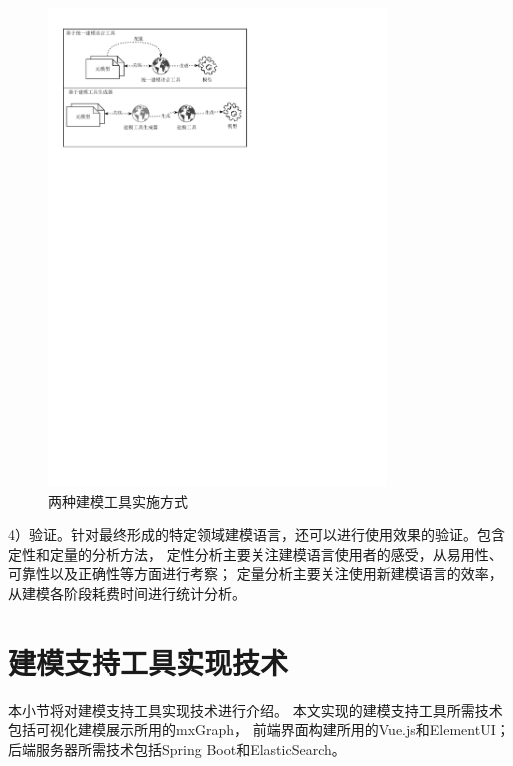 \begin{figure}[!htbp] %
    \centering %
    \includegraphics[width=0.8\textwidth]{FIGs/chapter3/2kindsmodeling.pdf} %
    \caption{两种建模工具实施方式} %
    \label{2kindsmodeling} %
\end{figure}%

4）验证。针对最终形成的特定领域建模语言，还可以进行使用效果的验证。包含定性和定量的分析方法，
定性分析主要关注建模语言使用者的感受，从易用性、可靠性以及正确性等方面进行考察；
定量分析主要关注使用新建模语言的效率，从建模各阶段耗费时间进行统计分析\cite{kardas2018domain}。


\section{建模支持工具实现技术}

本小节将对建模支持工具实现技术进行介绍。
本文实现的建模支持工具所需技术包括可视化建模展示所用的mxGraph，
前端界面构建所用的Vue.js和ElementUI；
后端服务器所需技术包括Spring Boot和ElasticSearch。


